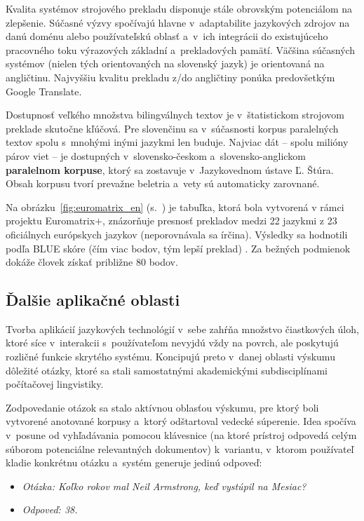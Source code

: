 \begin{multicols}{2}

Kvalita systémov strojového prekladu disponuje stále obrovským
potenciálom na zlepšenie. Súčasné výzvy spočívajú hlavne
v~adaptabilite jazykových zdrojov na danú doménu alebo
používateľskú oblasť a~v~ich integrácii do existujúceho
pracovného toku výrazových základní a~prekladových pamätí.
Väčšina súčasných systémov (nielen tých orientovaných na
slovenský jazyk) je orientovaná na angličtinu. Najvyššiu kvalitu
prekladu z/do angličtiny ponúka predovšetkým Google Translate. 

Dostupnosť veľkého množstva bilingválnych textov je v~štatistickom
strojovom preklade skutočne kľúčová. Pre slovenčinu sa
v~súčasnosti korpus paralelných textov spolu s~mnohými inými
jazykmi len buduje. Najviac dát -- spolu milióny párov viet -- je
dostupných v~slovensko-českom a~slovensko-anglickom \textbf{paralelnom
korpuse}, ktorý sa zostavuje v~Jazykovednom ústave Ľ. Štúra. Obsah
korpusu tvorí prevažne beletria a~vety sú automaticky zarovnané.

Na obrázku~\ref{fig:euromatrix_en} (s.~\pageref{fig:euromatrix_en}) je tabuľka, ktorá bola vytvorená v rámci projektu Euromatrix+, znázorňuje presnosť prekladov medzi 22 jazykmi z 23 oficiálnych európskych jazykov (neporovnávala sa írčina). Výsledky sa hodnotili podľa BLUE skóre (čím viac bodov, tým lepší preklad) \cite{bleu1}. Za bežných podmienok dokáže človek získať približne 80 bodov.

\subsection{Ďalšie aplikačné oblasti}
Tvorba aplikácií jazykových technológií v~sebe zahŕňa množstvo čiastkových úloh, ktoré síce v~interakcii s~používateľom nevyjdú vždy na povrch, ale poskytujú rozličné funkcie skrytého systému. Koncipujú preto v~danej oblasti výskumu dôležité otázky, ktoré sa stali samostatnými akademickými subdisciplínami počítačovej lingvistiky.

Zodpovedanie otázok sa stalo aktívnou oblasťou výskumu,
pre ktorý boli vytvorené anotované korpusy a~ktorý odštartoval
vedecké súperenie. Idea spočíva v~posune od vyhľadávania pomocou
klávesnice (na ktoré prístroj odpovedá celým súborom potenciálne
relevantných dokumentov) k~variantu, v~ktorom používateľ kladie
konkrétnu otázku a~systém generuje jedinú odpoveď:

\begin{itemize}
	\item[] \textit{Otázka: Koľko rokov mal
Neil Armstrong, keď vystúpil na Mesiac?}
	\item[] \textit{Odpoveď: 38.}
\end{itemize}


\end{multicols}
